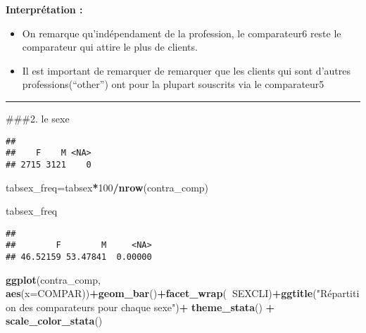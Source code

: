 \documentclass[
]{article}
\newenvironment{Shaded}{\begin{snugshade}}{\end{snugshade}}
\newcommand{\DataTypeTok}[1]{\textcolor[rgb]{0.13,0.29,0.53}{#1}}
\newcommand{\DecValTok}[1]{\textcolor[rgb]{0.00,0.00,0.81}{#1}}
\newcommand{\KeywordTok}[1]{\textcolor[rgb]{0.13,0.29,0.53}{\textbf{#1}}}
\newcommand{\NormalTok}[1]{#1}
\newcommand{\OperatorTok}[1]{\textcolor[rgb]{0.81,0.36,0.00}{\textbf{#1}}}
\newcommand{\StringTok}[1]{\textcolor[rgb]{0.31,0.60,0.02}{#1}}
\begin{document}
\textbf{Interprétation :}

\begin{itemize}
\item
  On remarque qu'indépendament de la profession, le comparateur6 reste
  le comparateur qui attire le plus de clients.
\item
  Il est important de remarquer de remarquer que les clients qui sont
  d'autres professions(``other'') ont pour la plupart souscrits via le
  comparateur5
\end{itemize}

\begin{center}\rule{0.5\linewidth}{0.5pt}\end{center}

\#\#\#2. le sexe

\begin{Shaded}
\end{Shaded}

\begin{verbatim}
## 
##    F    M <NA> 
## 2715 3121    0
\end{verbatim}

\begin{Shaded}
\begin{Highlighting}[]
\NormalTok{tabsex_freq=tabsex}\OperatorTok{*}\DecValTok{100}\OperatorTok{/}\KeywordTok{nrow}\NormalTok{(contra_comp)}

\NormalTok{tabsex_freq}
\end{Highlighting}
\end{Shaded}

\begin{verbatim}
## 
##        F        M     <NA> 
## 46.52159 53.47841  0.00000
\end{verbatim}

\begin{Shaded}
\begin{Highlighting}[]
\KeywordTok{ggplot}\NormalTok{(contra_comp, }\KeywordTok{aes}\NormalTok{(}\DataTypeTok{x=}\NormalTok{COMPAR))}\OperatorTok{+}\KeywordTok{geom_bar}\NormalTok{()}\OperatorTok{+}\KeywordTok{facet_wrap}\NormalTok{(}\OperatorTok{~}\NormalTok{SEXCLI)}\OperatorTok{+}\KeywordTok{ggtitle}\NormalTok{(}\StringTok{"Répartition des comparateurs pour chaque sexe"}\NormalTok{)}\OperatorTok{+}\StringTok{ }\KeywordTok{theme_stata}\NormalTok{() }\OperatorTok{+}\StringTok{ }\KeywordTok{scale_color_stata}\NormalTok{()}
\end{Highlighting}
\end{Shaded}
\end{document}
